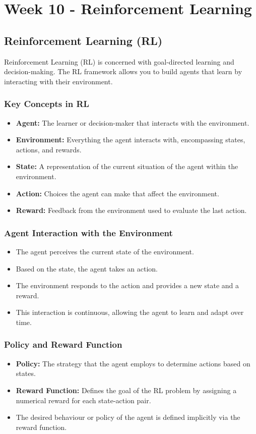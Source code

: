 \documentclass[8pt]{article}
\begin{document}
\newpage
\section{Week 10 - Reinforcement Learning}
\subsection*{Reinforcement Learning (RL)}
Reinforcement Learning (RL) is concerned with goal-directed learning and decision-making. The RL framework allows you to build agents that learn by interacting with their environment.

\subsubsection*{Key Concepts in RL}
\begin{itemize}
    \item \textbf{Agent:} The learner or decision-maker that interacts with the environment.
    \item \textbf{Environment:} Everything the agent interacts with, encompassing states, actions, and rewards.
    \item \textbf{State:} A representation of the current situation of the agent within the environment.
    \item \textbf{Action:} Choices the agent can make that affect the environment.
    \item \textbf{Reward:} Feedback from the environment used to evaluate the last action.
\end{itemize}

\subsubsection*{Agent Interaction with the Environment}
\begin{itemize}
    \item The agent perceives the current state of the environment.
    \item Based on the state, the agent takes an action.
    \item The environment responds to the action and provides a new state and a reward.
    \item This interaction is continuous, allowing the agent to learn and adapt over time.
\end{itemize}

\subsubsection*{Policy and Reward Function}
\begin{itemize}
    \item \textbf{Policy:} The strategy that the agent employs to determine actions based on states.
    \item \textbf{Reward Function:} Defines the goal of the RL problem by assigning a numerical reward for each state-action pair.
    \item The desired behaviour or policy of the agent is defined implicitly via the reward function.
\end{itemize}
\end{document}
